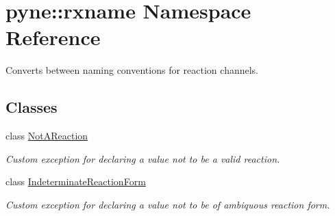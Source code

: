\hypertarget{namespacepyne_1_1rxname}{\section{pyne\-:\-:rxname Namespace Reference}
\label{namespacepyne_1_1rxname}
}


Converts between naming conventions for reaction channels.  


\subsection*{Classes}
\begin{DoxyCompactItemize}
\item 
class \hyperlink{classpyne_1_1rxname_1_1_not_a_reaction}{Not\-A\-Reaction}
\begin{DoxyCompactList}\small\item\em Custom exception for declaring a value not to be a valid reaction. \end{DoxyCompactList}\item 
class \hyperlink{classpyne_1_1rxname_1_1_indeterminate_reaction_form}{Indeterminate\-Reaction\-Form}
\begin{DoxyCompactList}\small\item\em Custom exception for declaring a value not to be of ambiquous reaction form. \end{DoxyCompactList}\end{DoxyCompactItemize}
